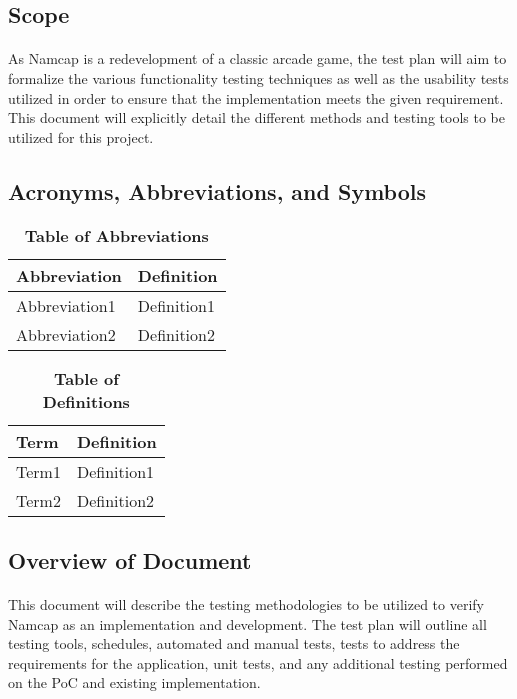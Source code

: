 \documentclass[12pt, titlepage]{article}
\begin{document}
\subsection{Scope}
\paragraph{}
As Namcap is a redevelopment of a classic arcade game, the test plan will aim to formalize the various functionality testing techniques as well as the usability tests utilized in order to ensure that the implementation meets the given requirement. This document will explicitly detail the different methods and testing tools to be utilized for this project.

\subsection{Acronyms, Abbreviations, and Symbols}
	
\begin{table}[hbp]
\caption{\textbf{Table of Abbreviations}} \label{Table}

\begin{tabularx}{\textwidth}{p{3cm}X}
\toprule
\textbf{Abbreviation} & \textbf{Definition} \\
\midrule
Abbreviation1 & Definition1\\
Abbreviation2 & Definition2\\
\bottomrule
\end{tabularx}

\end{table}

\begin{table}[!htbp]
\caption{\textbf{Table of Definitions}} \label{Table}

\begin{tabularx}{\textwidth}{p{3cm}X}
\toprule
\textbf{Term} & \textbf{Definition}\\
\midrule
Term1 & Definition1\\
Term2 & Definition2\\
\bottomrule
\end{tabularx}

\end{table}	

\subsection{Overview of Document}
\paragraph{}
This document will describe the testing methodologies to be utilized to verify Namcap as an implementation and development. The test plan will outline all testing tools, schedules, automated and manual tests, tests to address the requirements for the application, unit tests, and any additional testing performed on the PoC and existing implementation.
\end{document}
